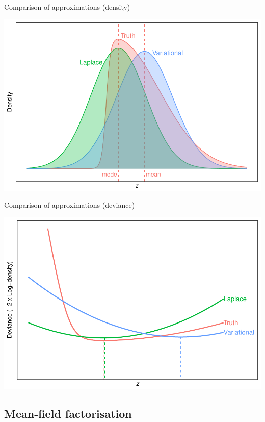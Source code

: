 \begin{frame}{Comparison of approximations (density)}
{    \begin{center}
      \includegraphics[scale=0.7]{figure/compare5}
    \end{center}
  } 
\end{frame}

\begin{frame}{Comparison of approximations (deviance)}
  \vspace{-5pt}
  \begin{center}
    \includegraphics[scale=0.7]{figure/compare6}
  \end{center}
\end{frame}

\subsection{Mean-field factorisation}

